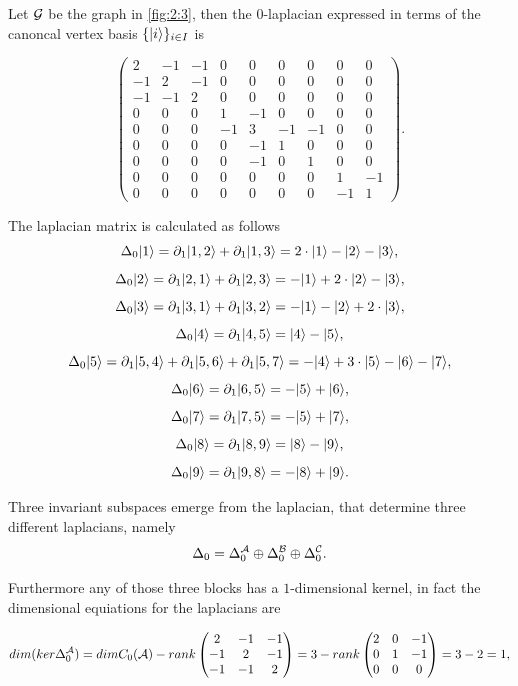 \documentclass[../2.tex]{subfiles}
\begin{document}
    \begin{exa}
        Let $\mathcal{G}$ be the graph  in \autoref{fig:2:3}, then the $0$-laplacian expressed in terms of the canoncal vertex basis $\{| i \rangle\}_{i \in I}$ is

        \[\begin{pmatrix}
                2 & -1 & -1 & 0 & 0 & 0 & 0 & 0 & 0 \\
                -1 & 2 & -1 & 0 & 0 & 0 & 0 & 0 & 0 \\
                -1 & -1 & 2 & 0 & 0 & 0 & 0 & 0 & 0 \\
                0 & 0 & 0 & 1 & -1 & 0 & 0 & 0 & 0 \\
                0 & 0 & 0 & -1 & 3 & -1 & -1 & 0 & 0 \\
                0 & 0 & 0 & 0 & -1 & 1 & 0 & 0 & 0 \\
                0 & 0 & 0 & 0 & -1 & 0 & 1 & 0 & 0 \\
                0 & 0 & 0 & 0 & 0 & 0 & 0 & 1 & -1 \\
                0 & 0 & 0 & 0 & 0 & 0 & 0 & -1 & 1 
            \end{pmatrix}. \] 

        The laplacian matrix is calculated as follows
        \[ \Delta_0 | 1 \rangle = \partial_1| 1,2 \rangle + \partial_1| 1,3 \rangle = 2\cdot| 1 \rangle-| 2 \rangle-| 3 \rangle,\]
        \[ \Delta_0 | 2 \rangle = \partial_1| 2,1 \rangle + \partial_1| 2,3 \rangle = -| 1 \rangle+2\cdot| 2 \rangle-| 3 \rangle,\]
        \[ \Delta_0 | 3 \rangle = \partial_1| 3,1 \rangle + \partial_1| 3,2 \rangle = -| 1 \rangle-| 2 \rangle+2\cdot| 3 \rangle,\]
        \[ \Delta_0 | 4 \rangle = \partial_1| 4,5 \rangle = | 4 \rangle-| 5 \rangle,\]
        \[ \Delta_0 | 5 \rangle = \partial_1| 5,4 \rangle+\partial_1| 5,6 \rangle+\partial_1| 5,7 \rangle = -| 4 \rangle+3\cdot| 5 \rangle-| 6 \rangle-| 7 \rangle,\]
        \[ \Delta_0 | 6 \rangle = \partial_1| 6,5 \rangle = -| 5 \rangle+| 6 \rangle,\]
        \[ \Delta_0 | 7 \rangle = \partial_1| 7,5 \rangle = -| 5 \rangle+| 7 \rangle,\]
        \[ \Delta_0 | 8 \rangle = \partial_1| 8,9 \rangle = | 8 \rangle-| 9 \rangle,\]
        \[ \Delta_0 | 9 \rangle = \partial_1| 9,8 \rangle = -| 8 \rangle+| 9 \rangle.\] 

        Three invariant subspaces emerge from the laplacian, that determine three different laplacians, namely
        \[ \Delta_0 = \Delta_0^{\mathcal{A}} \oplus \Delta_0^{\mathcal{B}} \oplus \Delta_0^{\mathcal{C}}. \]

        Furthermore any of those three blocks has a $1$-dimensional kernel, in fact the dimensional equiations for the laplacians are

        \[dim(ker\Delta_0^{\mathcal{A}}) =dimC_0(\mathcal{A}) - rank
        \begin{pmatrix}
            2 & -1 & -1  \\
            -1 & 2 & -1  \\
            -1 & -1 & 2 
        \end{pmatrix} = 3 - rank
        \begin{pmatrix}
            2 & 0 & -1  \\
            0 & 1 & -1  \\
            0 & 0 & 0 
        \end{pmatrix} = 3 - 2 =  1, \]


\end{exa}
\end{document}
